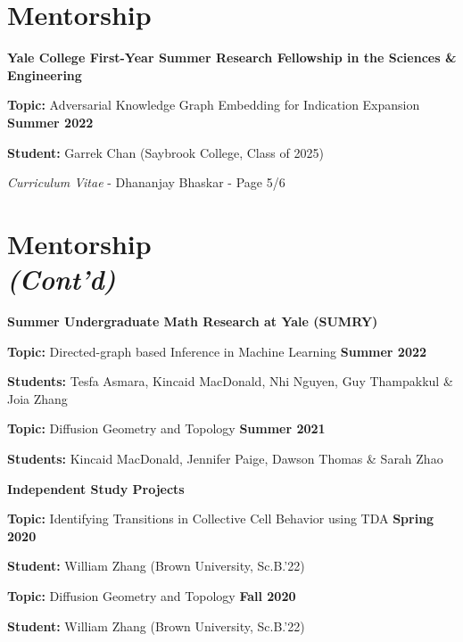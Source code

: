 \documentclass[margin,line]{res}
\newenvironment{list1}{
  \begin{list}{\ding{113}}{
      \setlength{\itemsep}{0in}
      \setlength{\parsep}{0in} \setlength{\parskip}{0in}
      \setlength{\topsep}{0in} \setlength{\partopsep}{0in}
      \setlength{\leftmargin}{0.17in}}}{\end{list}}
\begin{document}
\begin{resume}
\section{\sc Mentorship}

{\bf Yale College First-Year Summer Research Fellowship in the Sciences \& Engineering}
\vspace*{.3cm}
\begin{list1}
\setlength\itemsep{0.2em}
\item[] {\bf Topic:} Adversarial Knowledge Graph Embedding for Indication Expansion \hfill {\bf \small Summer 2022}
\item[] {\bf Student:} Garrek Chan (Saybrook College, Class of 2025) 
\end{list1}

\newpage
\begin{flushright}
\textit{Curriculum Vitae} - Dhananjay Bhaskar - Page 5/6
\end{flushright}
\vspace*{.1cm}

\section{\sc Mentorship\\ \textit{(Cont'd)}}

{\bf Summer Undergraduate Math Research at Yale (SUMRY)}
\vspace*{.3cm}
\begin{list1}
\setlength\itemsep{0.2em}
\item[] {\bf Topic:} Directed-graph based Inference in Machine Learning \hfill {\bf \small Summer 2022}
\item[] {\bf Students:} Tesfa Asmara, Kincaid MacDonald, Nhi Nguyen, Guy Thampakkul \& Joia Zhang 
\end{list1}
\vspace*{.3cm}
\begin{list1}
\setlength\itemsep{0.2em}
\item[] {\bf Topic:} Diffusion Geometry and Topology \hfill {\bf \small Summer 2021}
\item[] {\bf Students:} Kincaid MacDonald, Jennifer Paige, Dawson Thomas \& Sarah Zhao
\end{list1}

{\bf Independent Study Projects}
\vspace*{.3cm}
\begin{list1}
\setlength\itemsep{0.2em}
\item[] {\bf Topic:} Identifying Transitions in Collective Cell Behavior using TDA \hfill {\bf \small Spring 2020}
\item[] {\bf Student:} William Zhang (Brown University, Sc.B.'22) 
\end{list1}
\vspace*{.3cm}
\begin{list1}
\setlength\itemsep{0.2em}
\item[] {\bf Topic:} Diffusion Geometry and Topology \hfill {\bf \small Fall 2020}
\item[] {\bf Student:} William Zhang (Brown University, Sc.B.'22)
\end{list1}


\end{resume}
\end{document}
